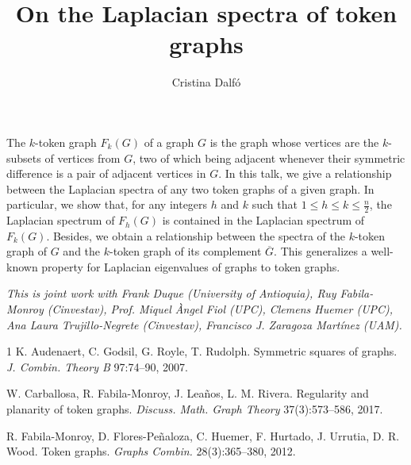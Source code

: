 \documentclass[a4paper]{amsart}
\date{}
\begin{document}
\title{On the Laplacian spectra of token graphs}
\author{Cristina Dalf\'o} %
\address{Universitat de Lleida} %

\maketitle


The $k$-token graph $F_k(G)$ of a graph $G$ is the
graph whose vertices are the $k$-subsets of vertices from $G$, two of which being adjacent whenever their symmetric difference is a pair of adjacent vertices in $G$. In this talk, we give a relationship between the Laplacian  spectra of any two token graphs of a given graph.
In particular, we show that, for any integers $h$ and $k$ such that $1\le h\le k\le \frac{n}{2}$, the Laplacian spectrum of $F_h(G)$ is contained in the Laplacian spectrum of $F_k(G)$. Besides, we obtain a relationship between the spectra of the $k$-token graph of $G$ and the $k$-token graph of its complement $\overline{G}$. This generalizes a well-known property for Laplacian eigenvalues of graphs to token graphs.

\emph{This is joint work with Frank Duque (University of Antioquia), Ruy Fabila-Monroy (Cinvestav), Prof. Miquel Àngel Fiol (UPC), Clemens Huemer (UPC), Ana Laura Trujillo-Negrete (Cinvestav), Francisco J. Zaragoza Mart\'inez (UAM).}

\begin{thebibliography}{1}
		K. Audenaert, C. Godsil, G. Royle, T. Rudolph.
\newblock Symmetric squares of graphs.
\newblock \emph{J. Combin. Theory B} 97:74--90, 2007.

W. Carballosa, R. Fabila-Monroy, J. Lea\~nos, L. M. Rivera. 
\newblock Regularity and planarity of token graphs.
\newblock \emph{Discuss. Math. Graph Theory} 37(3):573--586, 2017.

R. Fabila-Monroy, D. Flores-Pe\~{n}aloza, C. Huemer, F. Hurtado, J. Urrutia, D. R. Wood.
\newblock Token graphs.
\newblock \emph{Graphs Combin.} 28(3):365--380, 2012.
\end{thebibliography}
\end{document}
